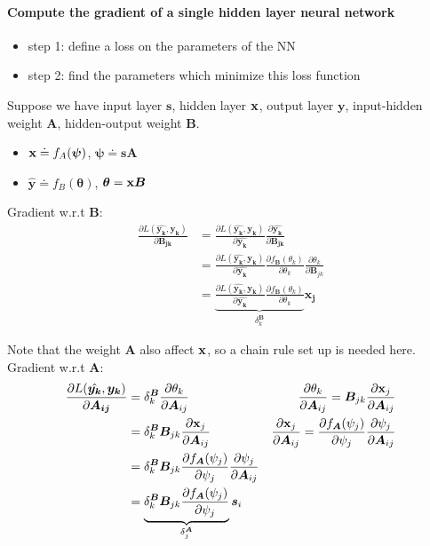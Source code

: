 \documentclass[sutton_barto_notes.tex]{subfiles}
\begin{document}
\paragraph{Compute the gradient of a single hidden layer neural network }

\begin{itemize}
\item step 1: define a loss on the parameters of the NN
\item step 2: find the parameters which minimize this loss function
\end{itemize}

Suppose we have input layer $\bm{s}$, hidden layer ${\operatorname*{\mathbf{x}}}$, output layer $\bm{y}$, input-hidden weight $\bm{A}$, hidden-output weight $\bm{B}$.

\begin{itemize}
\item ${\operatorname*{\mathbf{x}}} \doteq f_A(\bm{\psi})$, $\bm{\psi} \doteq \bm{s}\bm{A}$
\item $\bm{\hat{y}} \doteq f_B(\bm{\theta})$, $\bm{\theta} = {\operatorname*{\mathbf{x}}}\bm{B}$
\end{itemize}

Gradient w.r.t $\bm{B}$:
\begin{align*}
\frac{\partial L(\hat{\bm{y_k}}, \bm{y_k})}{\partial \bm{B_{jk}}} &= \frac{\partial L(\hat{\bm{y_k}}, \bm{y_k})}{\partial \hat{\bm{y_k}}}\frac{\partial \hat{\bm{y_k}}}{\partial \bm{B_{jk}}} \\
&= \frac{\partial L(\hat{\bm{y_k}}, \bm{y_k})}{\partial \hat{\bm{y_k}}}\frac{\partial f_{\bm{B}}(\theta_k)}{\partial\theta_k}\frac{\partial\theta_k}{\partial\bm{B}_{jk}} \\
&= \underbrace{\frac{\partial L(\hat{\bm{y_k}}, \bm{y_k})}{\partial \hat{\bm{y_k}}}\frac{\partial f_{\bm{B}}(\theta_k)}{\partial\theta_k}}_{\delta_k^{\bm{B}}} \bm{x_j}
\end{align*}

Note that the weight $\bm{A}$ also affect ${\operatorname*{\mathbf{x}}}$, so a chain rule set up is needed here. Gradient w.r.t $\bm{A}$:
\begin{align*}
\frac{\partial L(\hat{\bm{y_k}}, \bm{y_k})}{\partial \bm{A_{ij}}} &= \delta_k^{\bm{B}} \frac{\partial\theta_k}{\partial\bm{A}_{ij}} & \frac{\partial\theta_k}{\partial\bm{A}_{ij}} = \bm{B}_{jk}\frac{\partial {\operatorname*{\mathbf{x}}}_j}{\partial \bm{A}_{ij}} \\
&= \delta_k^{\bm{B}} \bm{B}_{jk}\frac{\partial {\operatorname*{\mathbf{x}}}_j}{\partial \bm{A}_{ij}} & \frac{\partial {\operatorname*{\mathbf{x}}}_j}{\partial \bm{A}_{ij}} = \frac{\partial f_{\bm{A}}(\psi_j) }{\partial \psi_j} \frac{\partial \psi_j}{\partial \bm{A}_{ij}} \\
&= \delta_k^{\bm{B}} \bm{B}_{jk} \frac{\partial f_{\bm{A}}(\psi_j) }{\partial \psi_j} \frac{\partial \psi_j}{\partial \bm{A}_{ij}} \\
&= \underbrace{\delta_k^{\bm{B}}\bm{B}_{jk} \frac{\partial f_{\bm{A}}(\psi_j) }{\partial \psi_j}}_{\delta_j^{\bm{A}}} \bm{s}_i
\end{align*}
\end{document}
